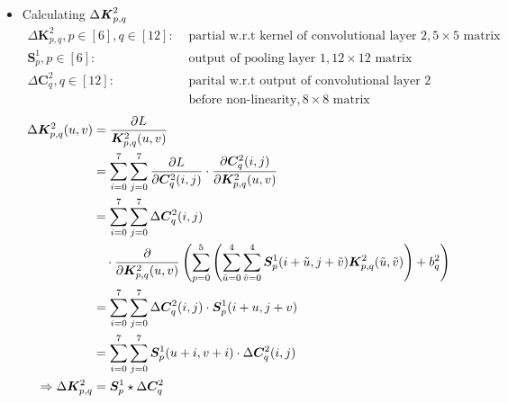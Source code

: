 \documentclass[12pt]{article}
\begin{document}
\begin{itemize}
\item Calculating $\Delta \textbf{\textit{K}}_{p, q}^2$
\begin{align*}
    \Delta \bm{K}^2_{p, q}, p \in [6], q \in [12]:& \text{ partial w.r.t kernel of convolutional layer 2}, 5 \times 5 \text{ matrix}\\
    \bm{S}^1_p, p \in [6]:& \text{ output of pooling layer 1}, 12 \times 12 \text{ matrix}\\
    \Delta \bm{C}_{q}^2, q \in [12]:& \text{ parital w.r.t output of convolutional layer 2} \\& \text{ before non-linearity}, 8 \times 8 \text{ matrix}
\end{align*}
\begin{align*}
    \Delta \bm{K}_{p, q}^2(u, v)
    &= \frac{\partial L}{\bm{K}_{p, q}^2(u, v)}\\
    &= \sum_{i=0}^{7}\sum_{j=0}^{7}\frac{\partial L}{\partial\bm{C}_{q}^2(i, j)}
    \cdot
    \frac{\partial\bm{C}_{q}^2(i, j)}{\partial\bm{K}_{p, q}^2(u, v)}\\
    &= \sum_{i=0}^{7}\sum_{j=0}^{7}\Delta \bm{C}_{q}^2(i, j)\\
    &\quad\cdot
    \frac{\partial}{\partial\bm{K}_{p, q}^2(u, v)}
    \left(\sum_{p = 0}^5\left(\sum_{\Tilde{u} = 0}^4\sum_{\Tilde{v} = 0}^4\bm{S}^1_p(i + \Tilde{u}, j + \Tilde{v})\bm{K}^2_{p, q}(\Tilde{u}, \Tilde{v})\right) + b^2_q\right)\\
    &= \sum_{i=0}^{7}\sum_{j=0}^{7}\Delta \bm{C}_{q}^2(i, j) \cdot \bm{S}^1_p(i + u, j + v)\\
    &= \sum_{i=0}^{7}\sum_{j=0}^{7} \bm{S}^1_p(u + i, v + i) \cdot \Delta\bm{C}_{q}^2(i, j) \\
    \Rightarrow
    \Delta \bm{K}_{p, q}^2 &= \bm{S}^1_p \star \Delta\bm{C}_{q}^2
\end{align*}


\end{itemize}
\end{document}
